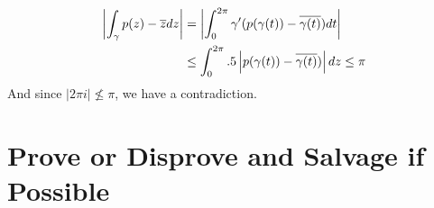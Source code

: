 \documentclass{homework}
\begin{document}
\begin{solution}
\begin{align*}
                                                                                                                                                                                                                                                                \left|\int_{\gamma} p(z) - \overline{z} dz\right| &=
                                                                                                                                                                                                                                                                        \left|\int_0^{2\pi} \gamma'(p(\gamma(t)) - \overline{\gamma(t)}) dt\right|\\
                                                                                                                                                                                                                                                                                &\leq \int_0^{2\pi} .5 \left|p(\gamma(t)) - \overline{\gamma(t)})\right| dz \leq \pi
                                                                                                                                                                                                                                                                                \end{align*}
                                                                                                                                                                                                                                                                                And since $|2\pi i|\not\leq \pi$, we have a contradiction.
                                                                                                                                                                                                                                                                                \end{solution}


                                                                                                                                                                                                                                                                                \section{Prove or Disprove and Salvage if Possible}
\end{document}

